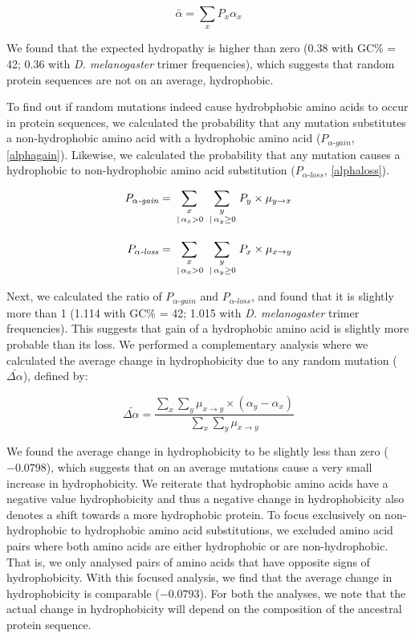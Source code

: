 \documentclass[12pt,a4paper]{article}
\begin{document}
\begin{equation}
\bar{\alpha} = \sum_{x} P_x \alpha_x
\label{expHydropathy}
\end{equation}


We found that the expected hydropathy is higher than zero (0.38 with GC\% = 42; 0.36 with \textit{D. melanogaster} trimer frequencies), which suggests that random protein sequences are not on an average, hydrophobic.
 
To find out if random mutations indeed cause hydrobphobic amino acids to occur in protein sequences, we calculated the probability that any mutation substitutes a non-hydrophobic amino acid with a hydrophobic amino acid ($P_{\alpha\textit{-gain}}$, \autoref{alphagain}). Likewise, we calculated the probability that any mutation causes a hydrophobic to non-hydrophobic amino acid substitution ($P_{\alpha\textit{-loss}}$, \autoref{alphaloss}).  

\begin{align}
P_{\alpha\textit{-gain}} & = \sum_{\genfrac{}{}{0pt}{1}{x}{\,|\,\alpha_x>0}} \sum_{\genfrac{}{}{0pt}{1}{y}{\,|\,\alpha_y \geq 0}} P_y \times \mu_{y\to x}\label{alphagain}\\[1em]
%
P_{\alpha\textit{-loss}} &= \sum_{\genfrac{}{}{0pt}{1}{x}{\,|\,\alpha_x>0}} \sum_{\genfrac{}{}{0pt}{1}{y}{\,|\,\alpha_y \geq 0}} P_x \times \mu_{x\to y}\label{alphaloss}
\end{align}

Next, we calculated the ratio of $P_{\alpha\textit{-gain}}$ and $P_{\alpha\textit{-loss}}$, and found that it is slightly more than 1 (1.114 with GC\% = 42; 1.015 with \textit{D. melanogaster} trimer frequencies). This suggests that gain of a hydrophobic amino acid is slightly more probable than its loss. We performed a complementary analysis where we calculated the average change in hydrophobicity due to any random mutation ($\bar{\Delta\alpha}$), defined by:

\begin{equation}
\bar{\Delta\alpha} = \frac{\displaystyle\sum_{x} \sum_{y} \mu_{x\to y} \times (\alpha_y - \alpha_x)}{\displaystyle\sum_{x} \sum_{y} \mu_{x\to y}}
\end{equation}

We found the average change in hydrophobicity to be slightly less than zero ($-0.0798$), which suggests that on an average mutations cause a very small increase in hydrophobicity. We reiterate that hydrophobic amino acids have a negative value hydrophobicity and thus a negative change in hydrophobicity also denotes a shift towards a more hydrophobic protein. To focus exclusively on non-hydrophobic to hydrophobic amino acid substitutions, we excluded amino acid pairs where both amino acids are either hydrophobic or are non-hydrophobic. That is, we only analysed pairs of amino acids that have opposite signs of hydrophobicity. With this focused analysis, we find that the average change in hydrophobicity is comparable ($-0.0793$). For both the analyses, we note that the actual change in hydrophobicity will depend on the composition of the ancestral protein sequence.
\end{document}
